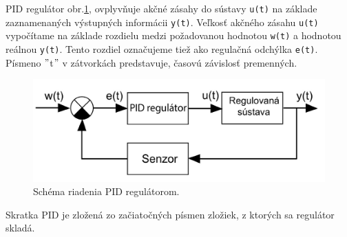 PID regulátor obr.\ref{OBRAZOK 3.3}, ovplyvňuje akčné zásahy do sústavy \verb|u(t)| na základe zaznamenaných výstupných informácii \verb|y(t)|. Veľkosť akčného zásahu \verb|u(t)| vypočítame na základe rozdielu medzi požadovanou hodnotou \verb|w(t)| a hodnotou reálnou \verb|y(t)|. Tento rozdiel označujeme tiež ako regulačná odchýlka \verb|e(t)|. Písmeno $"$t$"$ v zátvorkách predstavuje, časovú závislosť premenných. 

\begin{figure}[!tbh]
	\centering
	\includegraphics[width=120mm]{obr/pid.png}
	\caption{Schéma riadenia PID regulátorom.}\label{OBRAZOK 3.3}
\end{figure}

Skratka PID je zložená zo začiatočných písmen zložiek, z ktorých sa regulátor skladá. 

